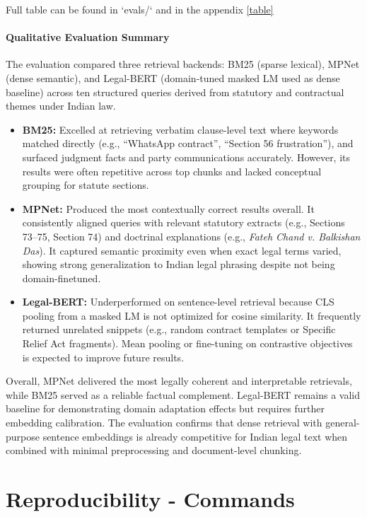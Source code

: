 \documentclass[11pt]{article}
\begin{document}
Full table can be found in `evals/` and in the appendix \ref{table}


\paragraph{Qualitative Evaluation Summary}
The evaluation compared three retrieval backends: BM25 (sparse lexical), MPNet (dense semantic), and Legal-BERT (domain-tuned masked LM used as dense baseline) across ten structured queries derived from statutory and contractual themes under Indian law.

\begin{itemize}[leftmargin=1.2em]
  \item \textbf{BM25:} Excelled at retrieving verbatim clause-level text where keywords matched directly (e.g., “WhatsApp contract”, “Section 56 frustration”), and surfaced judgment facts and party communications accurately. However, its results were often repetitive across top chunks and lacked conceptual grouping for statute sections.
  \item \textbf{MPNet:} Produced the most contextually correct results overall. It consistently aligned queries with relevant statutory extracts (e.g., Sections 73–75, Section 74) and doctrinal explanations (e.g., \textit{Fateh Chand v. Balkishan Das}). It captured semantic proximity even when exact legal terms varied, showing strong generalization to Indian legal phrasing despite not being domain-finetuned.
  \item \textbf{Legal-BERT:} Underperformed on sentence-level retrieval because CLS pooling from a masked LM is not optimized for cosine similarity. It frequently returned unrelated snippets (e.g., random contract templates or Specific Relief Act fragments). Mean pooling or fine-tuning on contrastive objectives is expected to improve future results.
\end{itemize}

Overall, MPNet delivered the most legally coherent and interpretable retrievals, while BM25 served as a reliable factual complement. Legal-BERT remains a valid baseline for demonstrating domain adaptation effects but requires further embedding calibration. The evaluation confirms that dense retrieval with general-purpose sentence embeddings is already competitive for Indian legal text when combined with minimal preprocessing and document-level chunking.



\section{Reproducibility - Commands}
\end{document}
